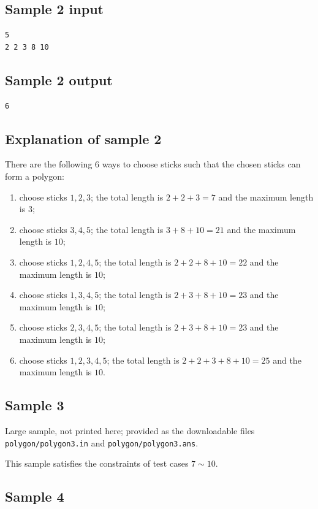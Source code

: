 \documentclass[11pt]{article}
\begin{document}
\subsection*{Sample 2 input}
\begin{verbatim}
5
2 2 3 8 10
\end{verbatim}

\subsection*{Sample 2 output}
\begin{verbatim}
6
\end{verbatim}

\subsection*{Explanation of sample 2}

There are the following $6$ ways to choose sticks such that the chosen
sticks can form a polygon:
\begin{enumerate}
\item choose sticks $1, 2, 3$; the total length is $2 + 2 + 3 = 7$ and
the maximum length is $3$;
\item choose sticks $3, 4, 5$; the total length is $3 + 8 + 10 = 21$ and
the maximum length is $10$;
\item choose sticks $1, 2, 4, 5$; the total length is $2 + 2 + 8 + 10 = 22$
and the maximum length is $10$;
\item choose sticks $1, 3, 4, 5$; the total length is $2 + 3 + 8 + 10 = 23$
and the maximum length is $10$;
\item choose sticks $2, 3, 4, 5$; the total length is $2 + 3 + 8 + 10 = 23$
and the maximum length is $10$;
\item choose sticks $1, 2, 3, 4, 5$; the total length is
$2 + 2 + 3 + 8 + 10 = 25$ and the maximum length is $10$.
\end{enumerate}

\subsection*{Sample 3}

Large sample, not printed here;
provided as the downloadable files \texttt{polygon/polygon3.in} and \texttt{polygon/polygon3.ans}.

This sample satisfies the constraints of test cases $7 \sim 10$.

\subsection*{Sample 4}
\end{document}
